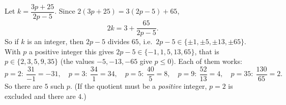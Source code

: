 Let $k=\dfrac{3p+25}{2p-5}$. Since $2(3p+25)=3(2p-5)+65$,
\[
2k=3+\dfrac{65}{2p-5}.
\]
So if $k$ is an integer, then $2p-5$ divides $65$, i.e.\ $2p-5\in\{\pm1,\pm5,\pm13,\pm65\}$. With $p$ a positive integer this gives $2p-5\in\{-1,1,5,13,65\}$, that is $p\in\{2,3,5,9,35\}$ (the values $-5,-13,-65$ give $p\le0$). Each of them works:
\[
p=2:\ \dfrac{31}{-1}=-31,\quad p=3:\ \dfrac{34}{1}=34,\quad p=5:\ \dfrac{40}{5}=8,\quad p=9:\ \dfrac{52}{13}=4,\quad p=35:\ \dfrac{130}{65}=2 .
\]
So there are $\boxed{5}$ such $p$. (If the quotient must be a \emph{positive} integer, $p=2$ is excluded and there are $4$.)
